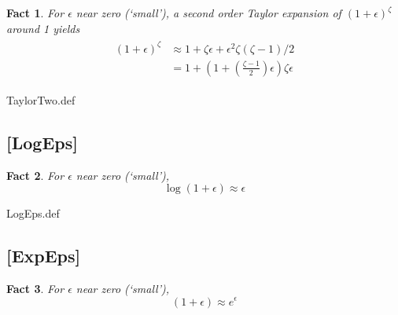 \documentclass{handout}
\newtheorem{Fact}{Fact}
\providecommand{\currentpdfbookmark}{}
\begin{document}
\begin{Fact} For $\epsilon$ near zero (`small'), a second order Taylor expansion
of $(1+\epsilon)^{\zeta}$ around 1 yields
\begin{equation}\begin{gathered}\begin{aligned}
 (1+\epsilon)^{\zeta} & \approx  1+ \zeta \epsilon  + \epsilon^{2} \zeta (\zeta-1)/2 
\\ & =  1 + \left(1 + \left(\frac{\zeta - 1}{2}\right)\epsilon\right)\zeta \epsilon 
\end{aligned}\end{gathered}\end{equation}
\end{Fact}

\begin{verbatimwrite}{TaylorTwo.def}
\providecommand{\TaylorTwo}{\href{https://www.econ2.jhu.edu/people/ccarroll/public/LectureNotes/MathFacts/MathFactsList\#TaylorTwo}{\ensuremath{\mathtt{[TaylorTwo]}}}}
\end{verbatimwrite}



\hypertarget{LogEps}{}
\subsection{[LogEps]}\label{fact:LogEps}

\begin{Fact} For $\epsilon$ near zero (`small'), 
\begin{equation}
\log (1+\epsilon) \approx \epsilon
\end{equation}
\end{Fact}

\begin{verbatimwrite}{LogEps.def}
\providecommand{\LogEps}{\href{https://www.econ2.jhu.edu/people/ccarroll/public/LectureNotes/MathFacts/MathFactsList\#LogEps}{\ensuremath{\mathtt{[LogEps]}}}}
\end{verbatimwrite}


\hypertarget{ExpEps}{}
\subsection{[ExpEps]}
\begin{Fact} For $\epsilon$ near zero (`small'), 
\begin{equation}
(1+\epsilon) \approx e^{\epsilon}
\end{equation}
\end{Fact}
\end{document}

